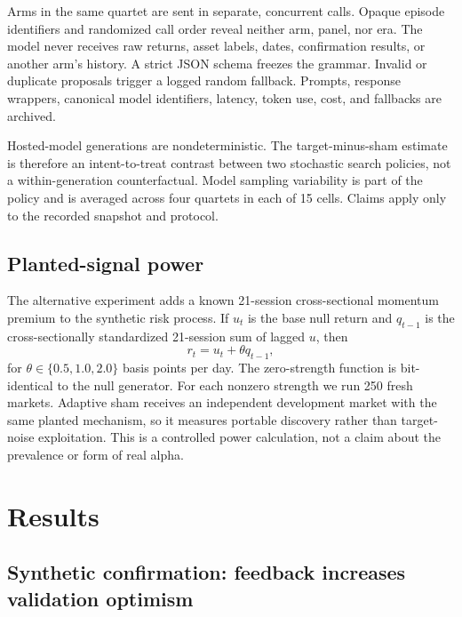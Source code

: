 \documentclass[sigconf,nonacm]{acmart}
\begin{document}
Arms in the same quartet are sent in separate, concurrent calls. Opaque episode
identifiers and randomized call order reveal neither arm, panel, nor era. The
model never receives raw returns, asset labels, dates, confirmation results, or
another arm's history. A strict JSON schema freezes the grammar. Invalid or
duplicate proposals trigger a logged random fallback. Prompts, response
wrappers, canonical model identifiers, latency, token use, cost, and fallbacks
are archived.

Hosted-model generations are nondeterministic. The target-minus-sham estimate
is therefore an intent-to-treat contrast between two stochastic search policies,
not a within-generation counterfactual. Model sampling variability is part of
the policy and is averaged across four quartets in each of 15 cells. Claims
apply only to the recorded snapshot and protocol.

\subsection{Planted-signal power}

The alternative experiment adds a known 21-session cross-sectional momentum
premium to the synthetic risk process. If $u_t$ is the base null return and
$q_{t-1}$ is the cross-sectionally standardized 21-session sum of lagged $u$,
then
\begin{equation}
 r_t=u_t+\theta q_{t-1},
\end{equation}
for $\theta\in\{0.5,1.0,2.0\}$ basis points per day. The zero-strength function
is bit-identical to the null generator. For each nonzero strength we run 250
fresh markets. Adaptive sham receives an independent development market with
the same planted mechanism, so it measures portable discovery rather than
target-noise exploitation. This is a controlled power calculation, not a claim
about the prevalence or form of real alpha.

\section{Results}

\subsection{Synthetic confirmation: feedback increases validation optimism}
\end{document}
